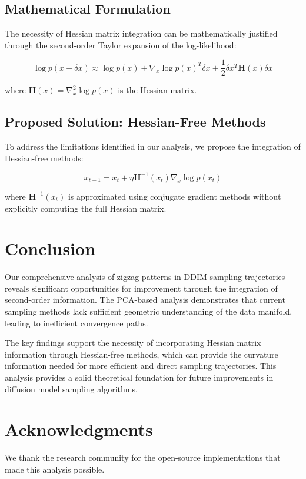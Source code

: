 \documentclass[11pt]{article}
\begin{document}
\subsection{Mathematical Formulation}
The necessity of Hessian matrix integration can be mathematically justified through the second-order Taylor expansion of the log-likelihood:

\begin{equation}
\log p(x + \delta x) \approx \log p(x) + \nabla_x \log p(x)^T \delta x + \frac{1}{2} \delta x^T \mathbf{H}(x) \delta x
\end{equation}

where $\mathbf{H}(x) = \nabla_x^2 \log p(x)$ is the Hessian matrix.

\subsection{Proposed Solution: Hessian-Free Methods}
To address the limitations identified in our analysis, we propose the integration of Hessian-free methods:

\begin{equation}
x_{t-1} = x_t + \eta \mathbf{H}^{-1}(x_t) \nabla_x \log p(x_t)
\end{equation}

where $\mathbf{H}^{-1}(x_t)$ is approximated using conjugate gradient methods without explicitly computing the full Hessian matrix.

\section{Conclusion}

Our comprehensive analysis of zigzag patterns in DDIM sampling trajectories reveals significant opportunities for improvement through the integration of second-order information. The PCA-based analysis demonstrates that current sampling methods lack sufficient geometric understanding of the data manifold, leading to inefficient convergence paths.

The key findings support the necessity of incorporating Hessian matrix information through Hessian-free methods, which can provide the curvature information needed for more efficient and direct sampling trajectories. This analysis provides a solid theoretical foundation for future improvements in diffusion model sampling algorithms.

\section*{Acknowledgments}
We thank the research community for the open-source implementations that made this analysis possible.
\end{document}
